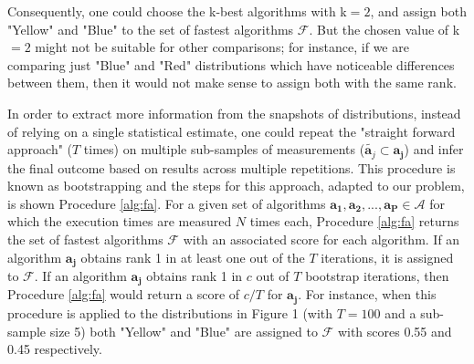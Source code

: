 \documentclass[conference]{IEEEtran}
\begin{document}
  Consequently, one could choose the k-best algorithms\cite{kbest-kadioglu2011algorithm} with k$=2$, and  assign both "Yellow" and "Blue" to the set of fastest algorithms $\mathcal{F}$. But the chosen value of k$=2$  might not be suitable for other comparisons; for instance, if we are comparing just "Blue" and "Red" distributions which have noticeable differences between them, then it would not make sense to assign both with the same rank.
  
 In order to extract more information from the snapshots of distributions, instead of relying on a single statistical estimate, one could repeat the "straight forward approach" ($T$ times) on multiple sub-samples of measurements ($\tilde{\mathbf{a}_j} \subset \mathbf{a_j}$) and infer the final outcome based on results across multiple repetitions. This procedure is known as bootstrapping\cite{bootstrap} and the steps for this approach, adapted to our problem, is shown Procedure \ref{alg:fa}. For a given set of algorithms $ \mathbf{a_1},\mathbf{a_2} ,..., \mathbf{a_P}\in \mathcal{A}$ for which the execution times are measured $N$ times each, Procedure \ref{alg:fa} returns the set of fastest algorithms $\mathcal{F}$ with an associated score for each algorithm. If an algorithm $\mathbf{a_j}$ obtains rank 1 in at least one out of the $T$ iterations, it is assigned to $\mathcal{F}$. If an algorithm $\mathbf{a_j}$ obtains rank 1 in $c$ out of $T$ bootstrap iterations, then Procedure \ref{alg:fa} would return a score of  $c/T$ for $\mathbf{a_j}$. For instance, when this procedure is applied to the distributions in Figure 1 (with $T=100$ and a sub-sample size 5) both "Yellow" and "Blue" are assigned to $\mathcal{F}$ with scores 0.55 and 0.45 respectively.
 
\end{document}
